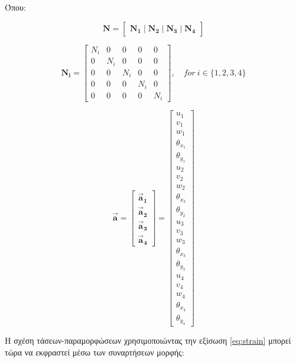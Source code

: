 Όπου:

\[
\mathbf{N} = \begin{bmatrix} \mathbf{N_1} \mid \mathbf{N_2} \mid \mathbf{N_3} \mid \mathbf{N_4} \end{bmatrix}
\]

\[
\mathbf{N_i} =  
  \begin{bmatrix}
      N_i & 0 & 0 & 0 & 0  \\
      0 & N_i & 0 & 0 & 0  \\
      0 & 0 & N_i & 0 & 0  \\
      0 & 0 & 0 & N_i & 0  \\
      0 & 0 & 0 & 0 & N_i 
  \end{bmatrix}, \quad for \ i \in \{1,2,3,4\}
\]



\[\vec{\mathbf{a}}=\begin{bmatrix}
{\vec{\mathbf{a}}}_{\mathbf{1}} \\
{\vec{\mathbf{a}}}_{\mathbf{2}} \\
{\vec{\mathbf{a}}}_{\mathbf{3}} \\
{\vec{\mathbf{a}}}_{\mathbf{4}}
\end{bmatrix}=\begin{bmatrix}
u_{1} \\
v_{1} \\
w_{1} \\
\theta_{x_{1}} \\
\theta_{y_{1}} \\
u_{2} \\
v_{2} \\
w_{2} \\
\theta_{x_{2}} \\
\theta_{y_{2}} \\
u_{3} \\
v_{3} \\
w_{3} \\
\theta_{x_{3}} \\
\theta_{y_{3}} \\
u_{4} \\
v_{4} \\
w_{4} \\
\theta_{x_{4}} \\
\theta_{y_{4}}
\end{bmatrix}\]

Η σχέση τάσεων-παραμορφώσεων χρησιμοποιώντας την εξίσωση \eqref{eq:strain} μπορεί τώρα να εκφραστεί μέσω των συναρτήσεων μορφής:

